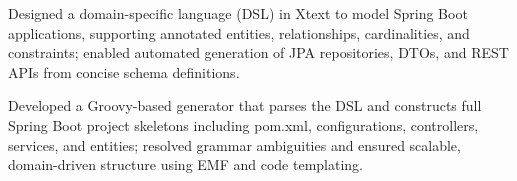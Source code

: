\vspace{4pt}
\begin{tightemize}
    \item Designed a domain-specific language (DSL) in Xtext to model Spring Boot applications, supporting annotated entities, relationships, cardinalities, and constraints; enabled automated generation of JPA repositories, DTOs, and REST APIs from concise schema definitions.
    \item Developed a Groovy-based generator that parses the DSL and constructs full Spring Boot project skeletons including pom.xml, configurations, controllers, services, and entities; resolved grammar ambiguities and ensured scalable, domain-driven structure using EMF and code templating.
\end{tightemize}
